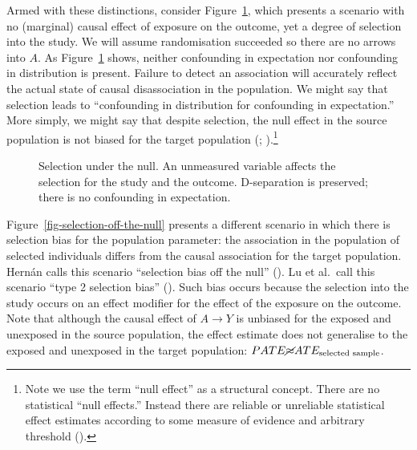 \documentclass[
  singlecolumn]{article}
\begin{document}
Armed with these distinctions, consider
Figure~\ref{fig-selection-under-the-null}, which presents a scenario
with no (marginal) causal effect of exposure on the outcome, yet a
degree of selection into the study. We will assume randomisation
succeeded so there are no arrows into \(A\). As
Figure~\ref{fig-selection-under-the-null} shows, neither confounding in
expectation nor confounding in distribution is present. Failure to
detect an association will accurately reflect the actual state of causal
disassociation in the population. We might say that selection leads to
``confounding in distribution for confounding in expectation.'' More
simply, we might say that despite selection, the null effect in the
source population is not biased for the target population
(;
).\footnote{Note
  we use the term ``null effect'' as a structural concept. There are no
  statistical ``null effects.'' Instead there are reliable or unreliable
  statistical effect estimates according to some measure of evidence and
  arbitrary threshold ().}

\begin{figure}


\caption{\label{fig-selection-under-the-null}Selection under the null.
An unmeasured variable affects the selection for the study and the
outcome. D-separation is preserved; there is no confounding in
expectation.}

\end{figure}%

Figure~\ref{fig-selection-off-the-null} presents a different scenario in
which there is selection bias for the population parameter: the
association in the population of selected individuals differs from the
causal association for the target population. Hernán calls this scenario
``selection bias off the null'' (). Lu et al.~call this scenario ``type 2 selection bias''
(). Such bias occurs because
the selection into the study occurs on an effect modifier for the effect
of the exposure on the outcome. Note that although the causal effect of
\(A\to Y\) is unbiased for the exposed and unexposed in the source
population, the effect estimate does not generalise to the exposed and
unexposed in the target population:
\(PATE \cancel{\approx} ATE_{\text{selected sample}}\).
\end{document}
